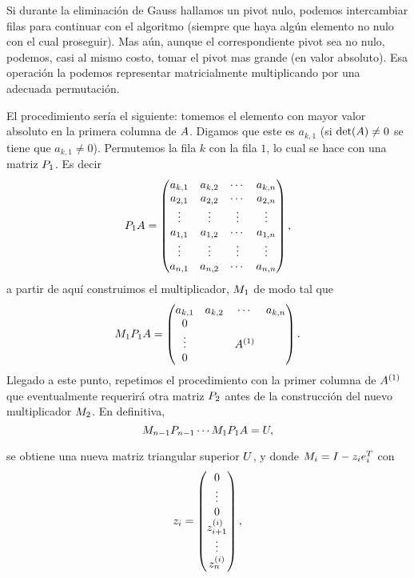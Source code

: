 \begin{tcolorbox}
Si durante la eliminación de Gauss hallamos un pivot nulo, podemos intercambiar filas para continuar con el algoritmo (siempre que haya algún elemento no nulo con el cual proseguir). Mas aún, aunque el correspondiente pivot sea no nulo, podemos,  casi al mismo costo, tomar el pivot mas grande (en valor absoluto).  Esa operación la podemos representar matricialmente multiplicando por una adecuada permutación.

El procedimiento sería el siguiente: tomemos el elemento con mayor valor absoluto en la primera columna de $\Ab$. Digamos que este es $a_{k,1}$ (si $\det(\Ab)\neq 0$ se tiene que $a_{k,1}\neq 0$). Permutemos la fila $k$ con la fila $1$, lo cual se hace con una matriz $\Pb_1$. Es decir
$$
\Pb_1\Ab=
\begin{pmatrix}
 a_{k,1}&a_{k,2}&\cdots &a_{k,n}\\
 a_{2,1}&a_{2,2}&\cdots &a_{2,n}\\
  \vdots&\vdots&\vdots&\vdots\\
 a_{1,1}&a_{1,2}&\cdots &a_{1,n}\\
 \vdots&\vdots&\vdots&\vdots \\
 a_{n,1}&a_{n,2}&\cdots &a_{n,n}
\end{pmatrix},
$$
a partir de aquí construimos el multiplicador, $\Mb_1$ de modo tal que
$$
\Mb_1\Pb_1\Ab=
\begin{pmatrix}
 a_{k,1}&a_{k,2}&\cdots &a_{k,n}\\
 0&&&\\
  \vdots&&\Ab^{(1)}&\\
 0&&&\\

\end{pmatrix}.
$$
Llegado a este punto, repetimos el procedimiento con la primer columna de $\Ab^{(1)}$ que eventualmente requerirá otra matriz $\Pb_2$ antes de la construcción del nuevo multiplicador $\Mb_2$. En definitiva,
\begin{equation}
 \label{eq:factoresPLU}
\Mb_{n-1}\Pb_{n-1}\cdots \Mb_{1}\Pb_{1}\Ab=\Ub,
 \end{equation}


se obtiene una nueva matriz triangular superior $\Ub$, y donde
$\Mb_i=\Ib-\zb_i\eb_i^T$ con
$$
\zb_i=
\begin{pmatrix}
 0\\
 \vdots\\
 0\\
 z_{i+1}^{(i)}\\
 \vdots \\
 z_n^{(i)}
\end{pmatrix},
$$



\end{tcolorbox}
